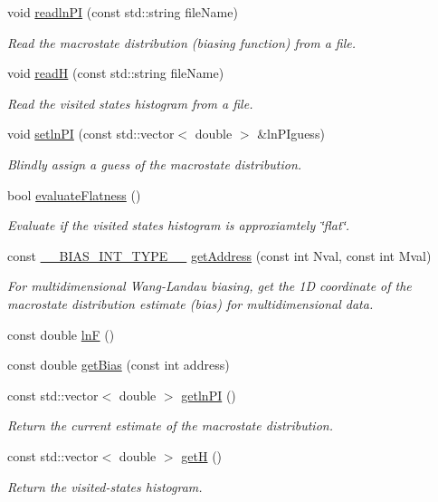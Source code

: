 \begin{DoxyCompactItemize}
void \hyperlink{classwala_ae04916f49c11b0636e813787a3906570}{readln\-P\-I} (const std\-::string file\-Name)
\begin{DoxyCompactList}\small\item\em Read the macrostate distribution (biasing function) from a file. \end{DoxyCompactList}\item 
void \hyperlink{classwala_a0b8df0fb2b7722fc4a458e527a478b6f}{read\-H} (const std\-::string file\-Name)
\begin{DoxyCompactList}\small\item\em Read the visited states histogram from a file. \end{DoxyCompactList}\item 
void \hyperlink{classwala_a1d778061b12611b1a35eb3ca15038d02}{setln\-P\-I} (const std\-::vector$<$ double $>$ \&ln\-P\-Iguess)
\begin{DoxyCompactList}\small\item\em Blindly assign a guess of the macrostate distribution. \end{DoxyCompactList}\item 
bool \hyperlink{classwala_add6302db96fcc45811b2944de2936525}{evaluate\-Flatness} ()
\begin{DoxyCompactList}\small\item\em Evaluate if the visited states histogram is approxiamtely \char`\"{}flat\char`\"{}. \end{DoxyCompactList}\item 
const \hyperlink{bias_8h_a1ceb524363fcb94da0c64d297ea27438}{\-\_\-\-\_\-\-B\-I\-A\-S\-\_\-\-I\-N\-T\-\_\-\-T\-Y\-P\-E\-\_\-\-\_\-} \hyperlink{classwala_a6120a0549bee60f2acabf6db132ff9d9}{get\-Address} (const int Nval, const int Mval)
\begin{DoxyCompactList}\small\item\em For multidimensional Wang-\/\-Landau biasing, get the 1\-D coordinate of the macrostate distribution estimate (bias) for multidimensional data. \end{DoxyCompactList}\item 
const double \hyperlink{classwala_acb8e59580d97bc3c5b9b4ff45eb6bb9a}{ln\-F} ()
\item 
const double \hyperlink{classwala_a03f7b333aa0a280e78060bd9af7ec318}{get\-Bias} (const int address)
\item 
const std\-::vector$<$ double $>$ \hyperlink{classwala_a80b00e34135eb6da4e81cd0935622fc5}{getln\-P\-I} ()
\begin{DoxyCompactList}\small\item\em Return the current estimate of the macrostate distribution. \end{DoxyCompactList}\item 
const std\-::vector$<$ double $>$ \hyperlink{classwala_a52cec7bdf93eec7d4eefc627b71f1f65}{get\-H} ()
\begin{DoxyCompactList}\small\item\em Return the visited-\/states histogram. \end{DoxyCompactList}\end{DoxyCompactItemize}


